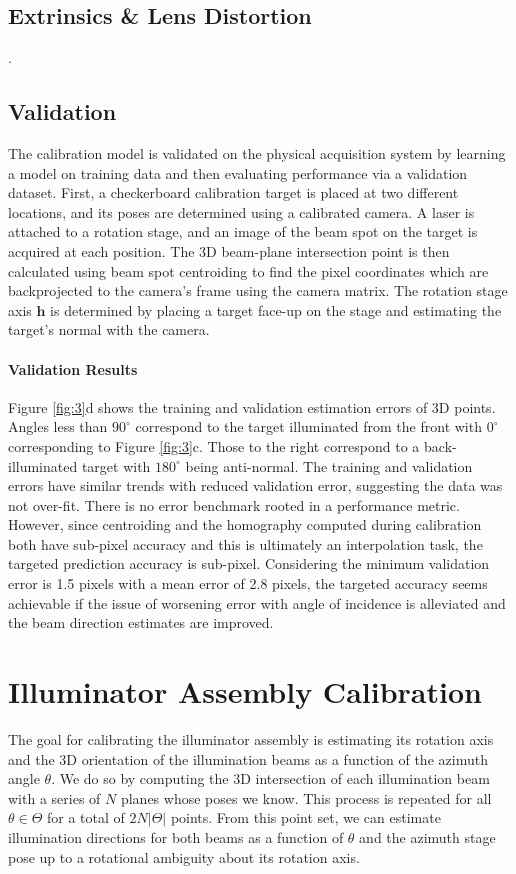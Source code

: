 \subsection{Extrinsics \& Lens Distortion}
.

\subsection{Validation}
The calibration model is validated on the physical acquisition system by learning a model on training data and then evaluating performance via a validation dataset. First, a checkerboard calibration target is placed at two different locations, and its poses are determined using a calibrated camera. A laser is attached to a rotation stage, and an image of the beam spot on the target is acquired at each position. The 3D beam-plane intersection point is then calculated using beam spot centroiding to find the pixel coordinates which are backprojected to the camera's frame using the camera matrix. The rotation stage axis $\mathbf{h}$ is determined by placing a target face-up on the stage and estimating the target's normal with the camera.


\paragraph{Validation Results} Figure \ref{fig:3}d shows the training and validation estimation errors of 3D points. Angles less than $90^\circ$ correspond to the target illuminated from the front with $0^\circ$ corresponding to Figure \ref{fig:3}c. Those to the right correspond to a back-illuminated target with $180^\circ$ being anti-normal. The training and validation errors have similar trends with reduced validation error, suggesting the data was not over-fit. There is no error benchmark rooted in a performance metric. However, since centroiding and the homography computed during calibration both have sub-pixel accuracy and this is ultimately an interpolation task, the targeted prediction accuracy is sub-pixel. Considering the minimum validation error is 1.5 pixels with a mean error of 2.8 pixels, the targeted accuracy seems achievable if the issue of worsening error with angle of incidence is alleviated and the beam direction estimates are improved.



\section{Illuminator Assembly Calibration}
The goal for calibrating the illuminator assembly is estimating its rotation axis and the 3D orientation of the illumination beams as a function of the azimuth angle $\theta$. We do so by computing the 3D intersection of each illumination beam with a series of $N$ planes whose poses we know. This process is repeated for all $\theta \in \Theta$ for a total of $2N|\Theta|$ points. From this point set, we can estimate illumination directions for both beams as a function of $\theta$ and the azimuth stage pose up to a rotational ambiguity about its rotation axis.

